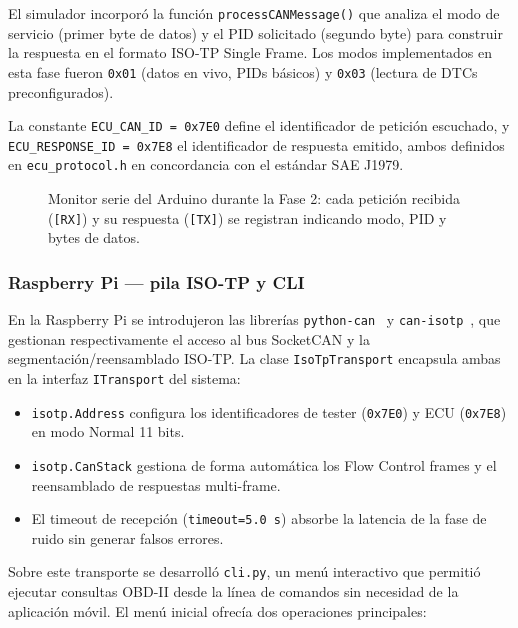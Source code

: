 El simulador incorporó la función \texttt{processCANMessage()} que analiza el modo de servicio (primer byte de datos) y el PID solicitado (segundo byte) para construir la respuesta en el formato ISO-TP Single Frame. Los modos implementados en esta fase fueron \texttt{0x01} (datos en vivo, PIDs básicos) y \texttt{0x03} (lectura de DTCs preconfigurados).

La constante \texttt{ECU\_CAN\_ID = 0x7E0} define el identificador de petición escuchado, y \texttt{ECU\_RESPONSE\_ID = 0x7E8} el identificador de respuesta emitido, ambos definidos en \texttt{ecu\_protocol.h} en concordancia con el estándar SAE J1979.

\begin{figure}[!htbp]
\centering
\caption{Monitor serie del Arduino durante la Fase 2: cada petición recibida (\texttt{[RX]}) y su respuesta (\texttt{[TX]}) se registran indicando modo, PID y bytes de datos.}
\label{fig:fase2_arduino_serial}
\end{figure}

\subsubsection*{Raspberry Pi — pila ISO-TP y CLI}

En la Raspberry Pi se introdujeron las librerías \texttt{python-can}~\cite{Twiss23-pythoncan} y \texttt{can-isotp}~\cite{Menager23-isotp}, que gestionan respectivamente el acceso al bus SocketCAN y la segmentación/reensamblado ISO-TP. La clase \texttt{IsoTpTransport} encapsula ambas en la interfaz \texttt{ITransport} del sistema:

\begin{itemize}
    \item \texttt{isotp.Address} configura los identificadores de tester (\texttt{0x7E0}) y ECU (\texttt{0x7E8}) en modo Normal 11 bits.
    \item \texttt{isotp.CanStack} gestiona de forma automática los Flow Control frames y el reensamblado de respuestas multi-frame.
    \item El timeout de recepción (\texttt{timeout=5.0\,s}) absorbe la latencia de la fase de ruido sin generar falsos errores.
\end{itemize}

Sobre este transporte se desarrolló \texttt{cli.py}, un menú interactivo que permitió ejecutar consultas OBD-II desde la línea de comandos sin necesidad de la aplicación móvil. El menú inicial ofrecía dos operaciones principales:

